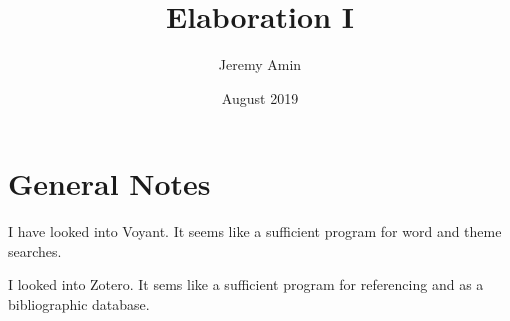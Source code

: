 \documentclass{article}
\title{Elaboration I}
\author{Jeremy Amin}
\date{August 2019}
\begin{document}
\maketitle

\section{General Notes}

I have looked into Voyant. It seems like a sufficient program for word and theme searches. 

I looked into Zotero. It sems like a sufficient program for referencing and as a bibliographic database.
\end{document}
